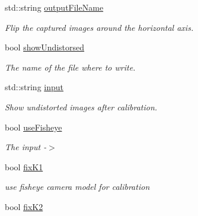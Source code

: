 \begin{DoxyCompactItemize}
\mbox{\label{class_settings_ab2fec20428d21ea867cc044c0a583cf1}} 
std\+::string \mbox{\hyperlink{class_settings_ab2fec20428d21ea867cc044c0a583cf1}{output\+File\+Name}}
\begin{DoxyCompactList}\small\item\em Flip the captured images around the horizontal axis. \end{DoxyCompactList}\item 
\mbox{\label{class_settings_a935d6f27ee454e9fee63f8b662f48a06}} 
bool \mbox{\hyperlink{class_settings_a935d6f27ee454e9fee63f8b662f48a06}{show\+Undistorsed}}
\begin{DoxyCompactList}\small\item\em The name of the file where to write. \end{DoxyCompactList}\item 
\mbox{\label{class_settings_a8696deae231b0efe48f1d069a4145ee6}} 
std\+::string \mbox{\hyperlink{class_settings_a8696deae231b0efe48f1d069a4145ee6}{input}}
\begin{DoxyCompactList}\small\item\em Show undistorted images after calibration. \end{DoxyCompactList}\item 
\mbox{\label{class_settings_ac8f271630d54f9d0c718ea0130972d44}} 
bool \mbox{\hyperlink{class_settings_ac8f271630d54f9d0c718ea0130972d44}{use\+Fisheye}}
\begin{DoxyCompactList}\small\item\em The input -\/$>$ \end{DoxyCompactList}\item 
\mbox{\label{class_settings_a25242813ee2c5e111ce48fe1f7f85e7b}} 
bool \mbox{\hyperlink{class_settings_a25242813ee2c5e111ce48fe1f7f85e7b}{fix\+K1}}
\begin{DoxyCompactList}\small\item\em use fisheye camera model for calibration \end{DoxyCompactList}\item 
\mbox{\label{class_settings_abad0b643dc5a39d493a6343d38f41578}} 
bool \mbox{\hyperlink{class_settings_abad0b643dc5a39d493a6343d38f41578}{fix\+K2}}

\end{DoxyCompactItemize}
